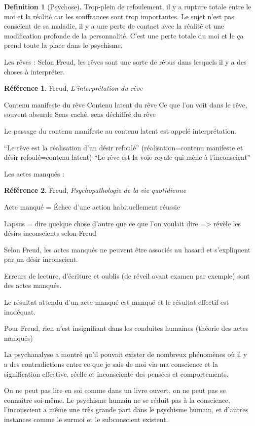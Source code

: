\documentclass[french]{book}
\theoremstyle{definition}
\newtheorem*{dfn}{Definition}
\newtheorem*{refe}{Référence}
\begin{document}
\begin{dfn}[Psychose]
	Trop-plein de refoulement, il y a rupture totale entre le moi et la réalité car les souffrances sont trop importantes. Le sujet n’est pas conscient de sa maladie, il y a une perte de contact avec la réalité et une modification profonde de la personnalité. C’est une perte totale du moi et le ça prend toute la place dans le psychisme.
\end{dfn}


Les rêves :
Selon Freud, les rêves sont une sorte de rébus dans lesquels il y a des choses à interpréter.
\begin{refe}
	Freud, \textit{L'interprétation du rêve}
\end{refe}

Contenu manifeste du rêve 
Contenu latent du rêve
Ce que l’on voit dans le rêve, souvent absurde
Sens caché, sens déchiffré du rêve

Le passage du contenu manifeste au contenu latent est appelé interprétation.

“Le rêve est la réalisation d’un désir refoulé” (réalisation=contenu manifeste et désir refoulé=contenu latent)
“Le rêve est la voie royale qui mène à l’inconscient”

Les actes manqués :
\begin{refe}
	Freud, \textit{Psychopathologie de la vie quotidienne}
\end{refe}

Acte manqué = Échec d’une action habituellement réussie

Lapsus = dire quelque chose d’autre que ce que l’on voulait dire => révèle les désirs inconscients selon Freud

Selon Freud, les actes manqués ne peuvent être associés au hasard et s’expliquent par un désir inconscient.

Erreurs de lecture, d’écriture et oublis (de réveil avant examen par exemple) sont des actes manqués.

Le résultat attendu d’un acte manqué est manqué et le résultat effectif est inadéquat.

Pour Freud, rien n’est insignifiant dans les conduites humaines (théorie des actes manqués)


La psychanalyse a montré qu’il pouvait exister de nombreux phénomènes où il y a des contradictions entre ce que je sais de moi via ma conscience et la signification effective, réelle et inconsciente des pensées et comportements.

On ne peut pas lire en soi comme dans un livre ouvert, on ne peut pas se connaître soi-même. Le psychisme humain ne se réduit pas à la conscience, l’inconscient a même une très grande part dans le psychisme humain, et d’autres instances comme le surmoi et le subconscient existent.
\end{document}
